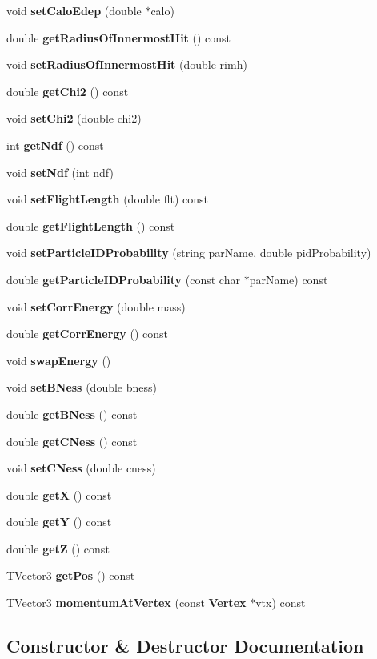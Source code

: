 \begin{DoxyCompactItemize}
\item 
void \textbf{ set\+Calo\+Edep} (double $\ast$calo)
\item 
double \textbf{ get\+Radius\+Of\+Innermost\+Hit} () const
\item 
void \textbf{ set\+Radius\+Of\+Innermost\+Hit} (double rimh)
\item 
double \textbf{ get\+Chi2} () const
\item 
void \textbf{ set\+Chi2} (double chi2)
\item 
int \textbf{ get\+Ndf} () const
\item 
void \textbf{ set\+Ndf} (int ndf)
\item 
void \textbf{ set\+Flight\+Length} (double flt) const
\item 
double \textbf{ get\+Flight\+Length} () const
\item 
void \textbf{ set\+Particle\+I\+D\+Probability} (string par\+Name, double pid\+Probability)
\item 
double \textbf{ get\+Particle\+I\+D\+Probability} (const char $\ast$par\+Name) const
\item 
void \textbf{ set\+Corr\+Energy} (double mass)
\item 
double \textbf{ get\+Corr\+Energy} () const
\item 
void \textbf{ swap\+Energy} ()
\item 
void \textbf{ set\+B\+Ness} (double bness)
\item 
double \textbf{ get\+B\+Ness} () const
\item 
double \textbf{ get\+C\+Ness} () const
\item 
void \textbf{ set\+C\+Ness} (double cness)
\item 
double \textbf{ getX} () const
\item 
double \textbf{ getY} () const
\item 
double \textbf{ getZ} () const
\item 
T\+Vector3 \textbf{ get\+Pos} () const
\item 
T\+Vector3 \textbf{ momentum\+At\+Vertex} (const \textbf{ Vertex} $\ast$vtx) const
\end{DoxyCompactItemize}


\subsection{Constructor \& Destructor Documentation}
\mbox{\label{classlcfiplus_1_1Track_a4fb662c3ca1e16e42601ae90d38e68b7}} 
